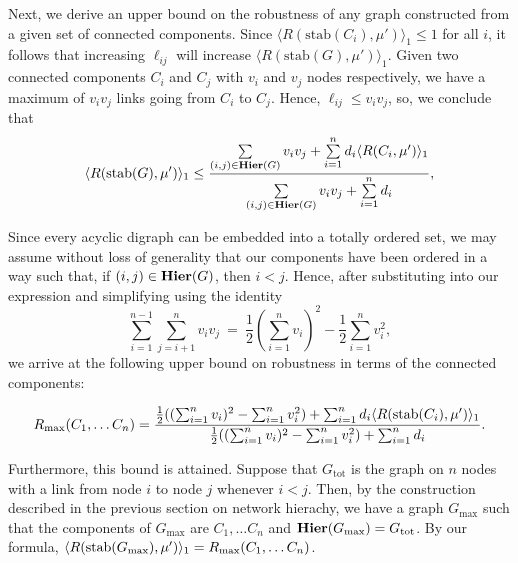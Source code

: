 Next, we derive an upper bound on the robustness of any graph
constructed from a given set of connected components.  Since
$\langle R(\textrm{stab}(C_i), \mu') \rangle_1 \le 1$ for all $i$, it follows that increasing $\ell_{ij}$ will
increase $\langle R(\textrm{stab}(G),\mu') \rangle_1$.  Given two connected components $C_i$ and $C_j$ with
$v_i$ and $v_j$ nodes respectively, we have a maximum of $v_i v_j$
links going from $C_i$ to $C_j$.  Hence, $\ell_{ij} \le v_i v_j$, so,
we conclude that
\begin{align}
\langle R(\textrm{stab}(G),\mu') \rangle_1 \le \frac{\sum\limits_{(i,j) \in \mathbf{Hier}(G)} v_i v_j +
               \sum\limits_{i=1}^n d_i \langle R(C_i,\mu') \rangle_1}
              {\sum\limits_{(i,j) \in \mathbf{Hier}(G)} v_i v_j +
               \sum\limits_{i=1}^n d_i},
\end{align}

Since every acyclic digraph can be embedded into a totally ordered
set, we may assume without loss of generality that our components have
been ordered in a way such that, if $(i,j) \in \mathbf{Hier}(G)$, then $i <
j$.  Hence, after substituting into our expression and simplifying
using the identity
$$\sum_{i=1}^{n-1}\sum_{j=i+1}^{n}v_i
v_j~=~\frac{1}{2} \left( \sum_{i=1}^{n} v_i \right)^2-\frac{1}{2} \sum_{i=1}^{n}
v_i^2,$$
we arrive at the following upper bound on robustness in terms
of the connected components:
\begin{widetext}
\begin{align} \label{eq:sccmaxrobustness}
R_{\mathrm{max}}(C_1, \ldots C_n) =
\frac{\frac{1}{2} ((\sum_{i=1}^n v_i)^2 - \sum_{i=1}^n v_i^2) +
                    \sum_{i=1}^n d_i \langle R(\hbox{stab}(C_i),\mu') \rangle_1}
     {\frac{1}{2} ((\sum_{i=1}^n v_i)^2 - \sum_{i=1}^n v_i^2) +
                    \sum_{i=1}^n d_i}.
\end{align}
\end{widetext}
Furthermore, this bound is attained.  Suppose that $G_{\mathrm{tot}}$
is the graph on $n$ nodes with a link from node $i$ to node $j$
whenever $i < j$.  Then, by the construction described in the previous
section on network hierachy, we have a graph $G_{\mathrm{max}}$ such
that the components of $G_{\mathrm{max}}$ are $C_1, \ldots C_n$ and
$\mathbf{Hier} (G_{\mathrm{max}}) = G_{\mathrm{tot}}$.  By our formula,
$\langle R(\hbox{stab} (G_{\mathrm{max}}), \mu') \rangle_1 = R_{\mathrm{max}}(C_1, \ldots C_n)$.

